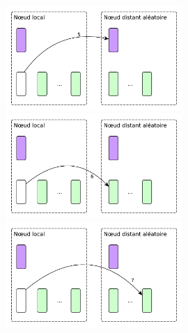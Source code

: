 \documentclass[xcolor={usenames,dvipsnames,svgnames,table}, aspectratio=43]{beamer}
\begin{document}
\begin{frame}
\begin{figure}
{  }%
   {%
    \includegraphics[width=0.6\textwidth]{graph/steal_strategies_anim_5.pdf}%
  }%
   {%
    \includegraphics[width=0.6\textwidth]{graph/steal_strategies_anim_6.pdf}%
  }%
   {%
    \includegraphics[width=0.6\textwidth]{graph/steal_strategies_anim_7.pdf}%
  }%
\end{figure}

\end{frame}
\end{document}
